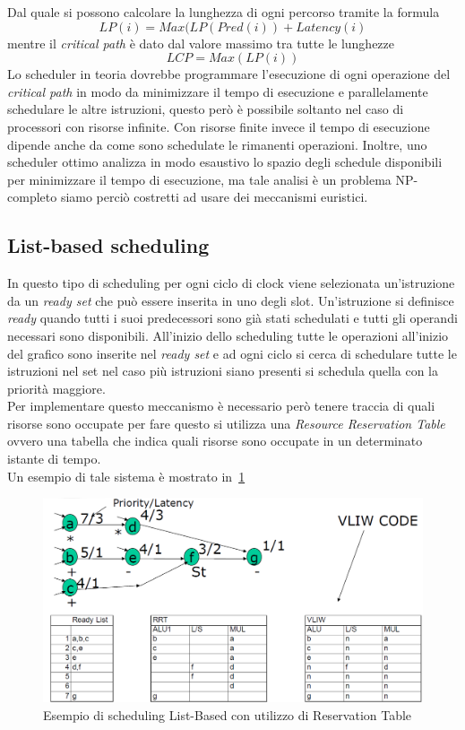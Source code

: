 Dal quale si possono calcolare la lunghezza di ogni percorso tramite la formula
$$LP(i)= Max(LP(Pred(i))+Latency(i)$$
mentre il \emph{critical path} è dato dal valore massimo tra tutte le lunghezze
$$LCP= Max(LP(i))$$
Lo scheduler in teoria dovrebbe programmare l'esecuzione di ogni operazione del \emph{critical path} in modo da minimizzare il tempo di esecuzione e parallelamente schedulare le altre istruzioni, questo però è possibile soltanto nel caso di processori con risorse infinite. Con risorse finite invece il tempo di esecuzione dipende anche da come sono schedulate le rimanenti operazioni. Inoltre, uno scheduler ottimo analizza in modo esaustivo lo spazio degli schedule disponibili per minimizzare il tempo di esecuzione, ma tale analisi è un problema NP-completo siamo perciò costretti ad usare dei meccanismi euristici.
\subsection{List-based scheduling}
In questo tipo di scheduling per ogni ciclo di clock viene selezionata un'istruzione da un \emph{ready set} che può essere inserita in uno degli slot. Un'istruzione si definisce \emph{ready} quando tutti i suoi predecessori sono già stati schedulati e tutti gli operandi necessari sono disponibili. All'inizio dello scheduling tutte le operazioni all'inizio del grafico sono inserite nel \emph{ready set} e ad ogni ciclo si cerca di schedulare tutte le istruzioni nel set nel caso più istruzioni siano presenti si schedula quella con la priorità maggiore.\\
Per implementare questo meccanismo è necessario però tenere traccia di quali risorse sono occupate per fare questo si utilizza una \emph{Resource Reservation Table} ovvero una tabella che indica quali risorse sono occupate in un determinato istante di tempo.\\
Un esempio di tale sistema è mostrato in \figurname\,\ref{fig:reservation}
\begin{figure}[htb]
\centering
\includegraphics[scale=0.5]{img/reservation.png}
\caption{Esempio di scheduling List-Based con utilizzo di Reservation Table}\label{fig:reservation}
\end{figure}
